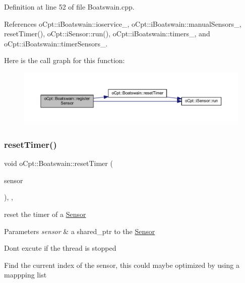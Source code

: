 Definition at line 52 of file Boatswain.\+cpp.



References o\+Cpt\+::i\+Boatswain\+::ioservice\+\_\+, o\+Cpt\+::i\+Boatswain\+::manual\+Sensors\+\_\+, reset\+Timer(), o\+Cpt\+::i\+Sensor\+::run(), o\+Cpt\+::i\+Boatswain\+::timers\+\_\+, and o\+Cpt\+::i\+Boatswain\+::timer\+Sensors\+\_\+.

Here is the call graph for this function\+:\nopagebreak
\begin{figure}[H]
\begin{center}
\leavevmode
\includegraphics[width=350pt]{classo_cpt_1_1_boatswain_ab36071db5e3f8a0db0053b5553e508f0_cgraph}
\end{center}
\end{figure}
\hypertarget{classo_cpt_1_1_boatswain_aca864b4219485c6d83ad0e92c7ea16fd}{}\label{classo_cpt_1_1_boatswain_aca864b4219485c6d83ad0e92c7ea16fd} 
\subsubsection{\texorpdfstring{reset\+Timer()}{resetTimer()}}
{\footnotesize\ttfamily void o\+Cpt\+::\+Boatswain\+::reset\+Timer (\begin{DoxyParamCaption}\item[{\hyperlink{classo_cpt_1_1i_sensor_a03533d2c5dc66e332d70dbb3b5e3006a}{i\+Sensor\+::ptr}}]{sensor }\end{DoxyParamCaption})\hspace{0.3cm}{\ttfamily [override]}, {\ttfamily [protected]}, {\ttfamily [virtual]}}

reset the timer of a \hyperlink{classo_cpt_1_1_sensor}{Sensor} 
\begin{DoxyParams}{Parameters}
{\em sensor} & a shared\+\_\+ptr to the \hyperlink{classo_cpt_1_1_sensor}{Sensor} \\
\hline
\end{DoxyParams}
Don\textquotesingle{}t excute if the thread is stopped

Find the current index of the sensor, this could maybe optimized by using a mappping list

